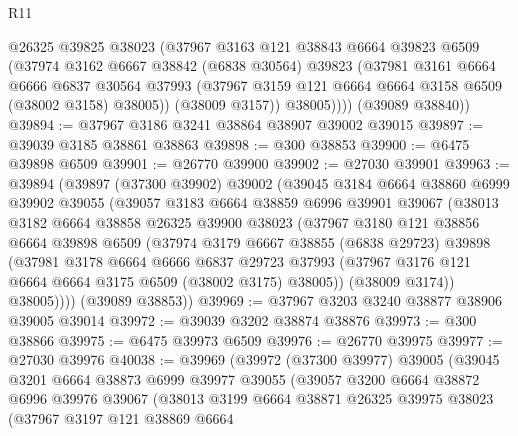 \begin{lexlean}{R11}
\begin{coremodule}
            @26325
            @39825
            @38023
            (@37967
              @3163
              @121
              @38843
              @6664
              @39823
              @6509
              (@37974
                @3162
                @6667
                @38842
                (@6838 @30564)
                @39823
                (@37981
                  @3161
                  @6664
                  @6666
                  @6837
                  @30564
                  @37993
                  (@37967 @3159 @121 @6664 @6664 @3158 @6509 (@38002 @3158) @38005))
                (@38009 @3157))
              @38005))))
      (@39089 @38840))
@39894 := @37967 @3186 @3241 @38864 @38907 @39002 @39015
@39897 := @39039 @3185 @38861 @38863
@39898 := @300 @38853
@39900 := @6475 @39898 @6509
@39901 := @26770 @39900
@39902 := @27030 @39901
@39963 := @39894
    (@39897
      (@37300 @39902)
      @39002
      (@39045
        @3184
        @6664
        @38860
        @6999
        @39902
        @39055
        (@39057
          @3183
          @6664
          @38859
          @6996
          @39901
          @39067
          (@38013
            @3182
            @6664
            @38858
            @26325
            @39900
            @38023
            (@37967
              @3180
              @121
              @38856
              @6664
              @39898
              @6509
              (@37974
                @3179
                @6667
                @38855
                (@6838 @29723)
                @39898
                (@37981
                  @3178
                  @6664
                  @6666
                  @6837
                  @29723
                  @37993
                  (@37967 @3176 @121 @6664 @6664 @3175 @6509 (@38002 @3175) @38005))
                (@38009 @3174))
              @38005))))
      (@39089 @38853))
@39969 := @37967 @3203 @3240 @38877 @38906 @39005 @39014
@39972 := @39039 @3202 @38874 @38876
@39973 := @300 @38866
@39975 := @6475 @39973 @6509
@39976 := @26770 @39975
@39977 := @27030 @39976
@40038 := @39969
    (@39972
      (@37300 @39977)
      @39005
      (@39045
        @3201
        @6664
        @38873
        @6999
        @39977
        @39055
        (@39057
          @3200
          @6664
          @38872
          @6996
          @39976
          @39067
          (@38013
            @3199
            @6664
            @38871
            @26325
            @39975
            @38023
            (@37967
              @3197
              @121
              @38869
              @6664

\end{coremodule}
\end{lexlean}
